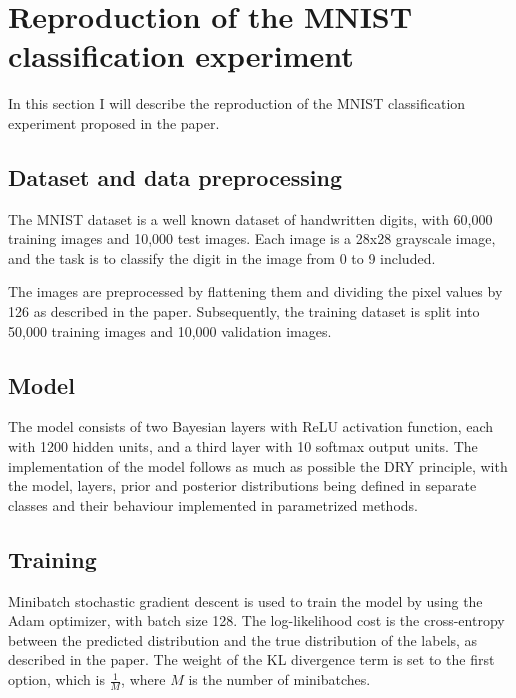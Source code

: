 \documentclass{article}
\begin{document}
\section{Reproduction of the MNIST classification experiment}

In this section I will describe the reproduction of the MNIST classification experiment proposed in the paper.

\subsection{Dataset and data preprocessing}

The MNIST dataset is a well known dataset of handwritten digits, with 60,000 training images and 10,000 test images. Each image is a 28x28 grayscale image, and the task is to classify the digit in the image from 0 to 9 included.

The images are preprocessed by flattening them and dividing the pixel values by 126 as described in the paper. Subsequently, the training dataset is split into 50,000 training images and 10,000 validation images.

\subsection{Model}

The model consists of two Bayesian layers with ReLU activation function, each with 1200 hidden units, and a third layer with 10 softmax output units. The implementation of the model follows as much as possible the DRY principle, with the model, layers, prior and posterior distributions being defined in separate classes and their behaviour implemented in parametrized methods.

\subsection{Training}

Minibatch stochastic gradient descent is used to train the model by using the Adam optimizer, with batch size 128. The log-likelihood cost is the cross-entropy between the predicted distribution and the true distribution of the labels, as described in the paper. The weight of the KL divergence term is set to the first option, which is $\frac{1}{M}$, where $M$ is the number of minibatches.
\end{document}
